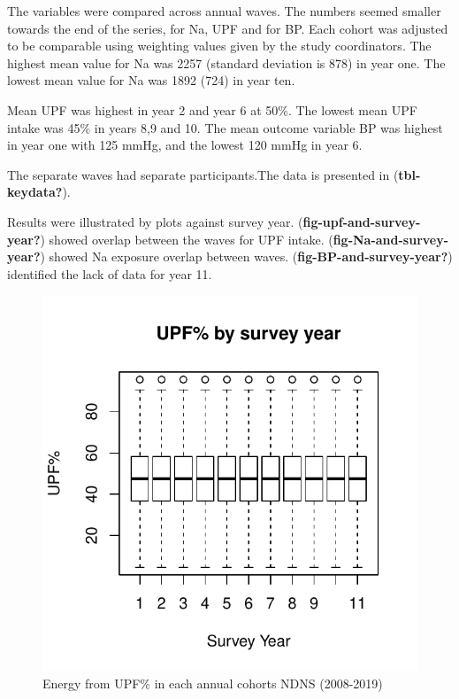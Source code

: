 \documentclass[
]{article}
\begin{document}
The variables were compared across annual waves. The numbers seemed
smaller towards the end of the series, for Na, UPF and for BP. Each
cohort was adjusted to be comparable using weighting values given by the
study coordinators. The highest mean value for Na was 2257 (standard
deviation is 878) in year one. The lowest mean value for Na was 1892
(724) in year ten.

Mean UPF was highest in year 2 and year 6 at 50\%. The lowest mean UPF
intake was 45\% in years 8,9 and 10. The mean outcome variable BP was
highest in year one with 125 mmHg, and the lowest 120 mmHg in year 6.

The separate waves had separate participants.The data is presented in
(\textbf{tbl-keydata?}).

Results were illustrated by plots against survey year.
(\textbf{fig-upf-and-survey-year?}) showed overlap between the waves for
UPF intake. (\textbf{fig-Na-and-survey-year?}) showed Na exposure
overlap between waves. (\textbf{fig-BP-and-survey-year?}) identified the
lack of data for year 11.

\begin{figure}
\centering
\includegraphics{nextlevel_files/figure-latex/fig-upf-and-survey-year-1.pdf}
\caption{Energy from UPF\% in each annual cohorts NDNS (2008-2019)}
\end{figure}
\end{document}
